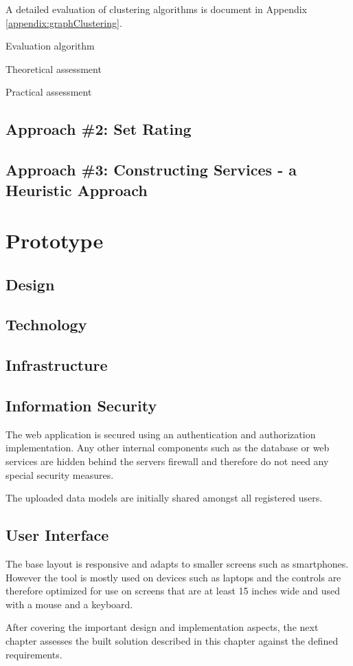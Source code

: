 A detailed evaluation of clustering algorithms is document in Appendix \ref{appendix:graphClustering}. 

Evaluation algorithm

Theoretical assessment

Practical assessment

\subsection{Approach \#2: Set Rating}

\subsection{Approach \#3: Constructing Services - a Heuristic Approach}

\section{Prototype} 

\subsection{Design}

\subsection{Technology}

\subsection{Infrastructure}

\subsection{Information Security}

The web application is secured using an authentication and authorization implementation. Any other internal components such as the database or web services are hidden behind the servers firewall and therefore do not need any special security measures.

The uploaded data models are initially shared amongst all registered users.

\subsection{User Interface}

The base layout is responsive and adapts to smaller screens such as smartphones. However the tool is mostly used on devices such as laptops and the controls are therefore optimized for use on screens that are at least 15 inches wide and used with a mouse and a keyboard.


\bigskip
After covering the important design and implementation aspects, the next chapter assesses the built solution described in this chapter against the defined requirements.
